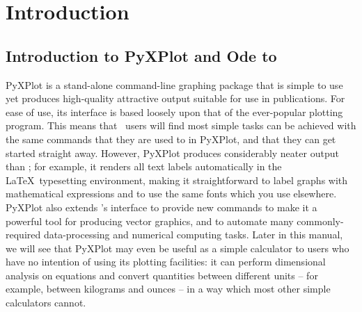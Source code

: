%
%
%
%
%



\chapter{Introduction} 

\label{introduction}

\section{Introduction to PyXPlot and Ode to \gnuplot}

{\sc PyXPlot} is a stand-alone command-line graphing package that is simple to
use yet produces high-quality attractive output suitable for use in
publications. For ease of use, its interface is based loosely upon that of the
ever-popular {\sc \gnuplot} plotting program. This means that
\gnuplot\ users will find most simple tasks can be achieved with the same
commands that they are used to in PyXPlot, and that they can get started
straight away. However, PyXPlot produces considerably neater output than
\gnuplot; for example, it renders all text labels automatically in the \LaTeX\
typesetting environment, making it straightforward to label graphs with
mathematical expressions and to use the same fonts which you use elsewhere.
PyXPlot also extends \gnuplot's interface to provide new commands to make it a
powerful tool for producing vector graphics, and to automate many
commonly-required data-processing and numerical computing tasks.  Later in this
manual, we will see that PyXPlot may even be useful as a simple calculator to
users who have no intention of using its plotting facilities: it can perform
dimensional analysis on equations and convert quantities between different
units -- for example, between kilograms and ounces -- in a way which most other
simple calculators cannot.

